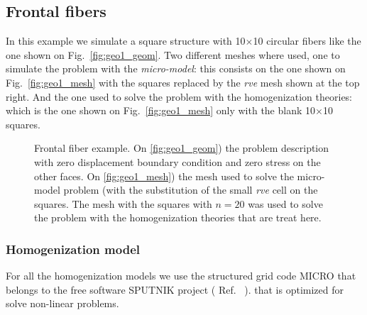 \documentclass[preprint]{elsarticle}
\newcommand{\sputnik}{{\ttfamily \fontseries{b}\selectfont SPUTNIK }}
\newcommand{\micro}{{\ttfamily \fontseries{b}\selectfont MICRO }}
\begin{document}

\subsection{Frontal fibers}

In this example we simulate a square structure with 10$\times$10 circular fibers 
like the one shown on Fig.~\ref{fig:geo1_geom}. 
Two different meshes where used, one to simulate the problem with the
\emph{micro-model}: 
this consists on the one shown on Fig.~\ref{fig:geo1_mesh} with the squares
replaced by the \emph{rve} mesh shown at the top right.
And the one used to solve the problem with the homogenization theories:
which is the one shown on Fig.~\ref{fig:geo1_mesh} only with the blank 
10$\times$10 squares.


\begin{figure}[!ht]
\begin{minipage}[b]{0.47\linewidth}
\subcaptionbox{\label{fig:geo1_geom}}{
\resizebox{8.0cm}{!}{}}
\end{minipage}
\hspace{2.2cm}
\begin{minipage}[b]{0.47\linewidth}
\subcaptionbox{\label{fig:geo1_mesh}}{
\resizebox{8.0cm}{!}{}}
\end{minipage}
\caption{Frontal fiber example. On \ref{fig:geo1_geom}) the problem description
         with zero displacement boundary condition and zero stress on the other faces. On
         \ref{fig:geo1_mesh}) the mesh used to solve the micro-model problem (with the
         substitution of the small \emph{rve} cell on the squares. The mesh with the
         squares with $n=20$ was used to solve the problem with the homogenization
         theories that are treat here. }
\label{fig_dist_scheme}
\end{figure}

\subsubsection{Homogenization model}

For all the homogenization models we use the structured grid code \micro that belongs to the 
free software \sputnik project ( Ref.~\cite{sputnik} ).
that is optimized for solve non-linear problems.
\end{document}
